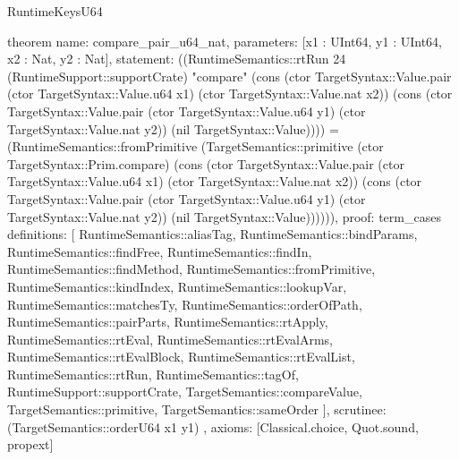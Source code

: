 \begin{lexlean}{RuntimeKeysU64}
\begin{semanticmodule}
theorem{
  name: compare_pair_u64_nat,
  parameters: [x1 : UInt64, y1 : UInt64, x2 : Nat, y2 : Nat],
  statement: ((RuntimeSemantics::rtRun 24 (RuntimeSupport::supportCrate) "compare" (cons (ctor TargetSyntax::Value.pair (ctor TargetSyntax::Value.u64 x1) (ctor TargetSyntax::Value.nat x2)) (cons (ctor TargetSyntax::Value.pair (ctor TargetSyntax::Value.u64 y1) (ctor TargetSyntax::Value.nat y2)) (nil TargetSyntax::Value)))) = (RuntimeSemantics::fromPrimitive (TargetSemantics::primitive (ctor TargetSyntax::Prim.compare) (cons (ctor TargetSyntax::Value.pair (ctor TargetSyntax::Value.u64 x1) (ctor TargetSyntax::Value.nat x2)) (cons (ctor TargetSyntax::Value.pair (ctor TargetSyntax::Value.u64 y1) (ctor TargetSyntax::Value.nat y2)) (nil TargetSyntax::Value)))))),
  proof: term_cases{
    definitions: [
      RuntimeSemantics::aliasTag,
      RuntimeSemantics::bindParams,
      RuntimeSemantics::findFree,
      RuntimeSemantics::findIn,
      RuntimeSemantics::findMethod,
      RuntimeSemantics::fromPrimitive,
      RuntimeSemantics::kindIndex,
      RuntimeSemantics::lookupVar,
      RuntimeSemantics::matchesTy,
      RuntimeSemantics::orderOfPath,
      RuntimeSemantics::pairParts,
      RuntimeSemantics::rtApply,
      RuntimeSemantics::rtEval,
      RuntimeSemantics::rtEvalArms,
      RuntimeSemantics::rtEvalBlock,
      RuntimeSemantics::rtEvalList,
      RuntimeSemantics::rtRun,
      RuntimeSemantics::tagOf,
      RuntimeSupport::supportCrate,
      TargetSemantics::compareValue,
      TargetSemantics::primitive,
      TargetSemantics::sameOrder
    ],
    scrutinee: (TargetSemantics::orderU64 x1 y1)
  },
  axioms: [Classical.choice, Quot.sound, propext]
}


\end{semanticmodule}
\end{lexlean}
